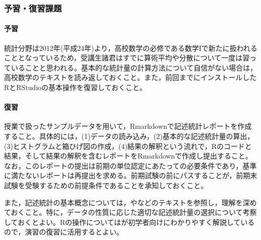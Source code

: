 \subsubsection{予習・復習課題}
\paragraph{予習}
統計分野は2012年(平成24年)より，高校数学の必修である数学Iで新たに扱われることとなっているため，受講生諸君はすでに算術平均や分散について一度は習っていることと思われる。基本的な統計量の計算方法について自信がない場合は，高校数学のテキストを読み返しておくこと。また，前回までにインストールしたRとRStudioの基本操作を復習しておくこと。
\paragraph{復習}
授業で扱ったサンプルデータを用いて，Rmarkdownで記述統計レポートを作成すること。具体的には，(1)データの読み込み，(2)基本的な記述統計量の算出，(3)ヒストグラムと箱ひげ図の作成，(4)結果の解釈という流れで，Rのコードと結果，そして結果の解釈を含むレポートをRmarkdownで作成し提出すること。なお，このレポートの提出は前期の単位認定にあたっての必要条件であり，基準に満たないレポートは再提出を求める。前期試験の前にパスすることが，前期末試験を受験するための前提条件であることを承知しておくこと。

また，記述統計の基本概念については，\textcite{Yamada2004}や\textcite{Kawabata201408}などのテキストを参照し，理解を深めておくこと。特に，データの性質に応じた適切な記述統計量の選択について考察しておくとよい。Rの操作については\textcite{kosugi2019}が初学者向けにわかりやすく解説しているので，演習の復習に活用するとよい。
